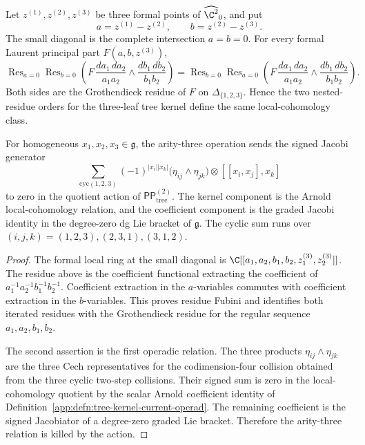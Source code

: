 \begin{lem}
\label{app:lem:arity-three-residue-jacobi}
  Let \(z^{(1)},z^{(2)},z^{(3)}\) be three formal points of
  \(\widehat{\C^2}_0\), and put
  \[
    a=z^{(1)}-z^{(2)},\qquad b=z^{(2)}-z^{(3)}.
  \]
  The small diagonal is the complete intersection \(a=b=0\).  For every
  formal Laurent principal part \(F(a,b,z^{(3)})\),
  \[
    \operatorname{Res}_{a=0}\operatorname{Res}_{b=0}
    \left(
      F\,
      \frac{da_1\,da_2}{a_1a_2}
      \wedge
      \frac{db_1\,db_2}{b_1b_2}
    \right)
    =
    \operatorname{Res}_{b=0}\operatorname{Res}_{a=0}
    \left(
      F\,
      \frac{da_1\,da_2}{a_1a_2}
      \wedge
      \frac{db_1\,db_2}{b_1b_2}
    \right).
  \]
  Both sides are the Grothendieck residue of \(F\) on
  \(\Delta_{\{1,2,3\}}\).  Hence the two nested-residue orders for the
  three-leaf tree kernel define the same local-cohomology class.

  For homogeneous \(x_1,x_2,x_3\in\mathfrak g\), the arity-three
  operation sends the signed Jacobi generator
  \[
    \sum_{\mathrm{cyc}(1,2,3)}
    (-1)^{|x_i||x_k|}
    \bigl(\eta_{ij}\wedge\eta_{jk}\bigr)
    \otimes [[x_i,x_j],x_k]
  \]
  to zero in the quotient action of
  \(\mathsf{PP}^{(2)}_{\mathrm{tree}}\).  The kernel component is the
  Arnold local-cohomology relation, and the coefficient component is the
  graded Jacobi identity in the degree-zero dg Lie bracket of
  \(\mathfrak g\).  The cyclic sum runs over
  \((i,j,k)=(1,2,3),(2,3,1),(3,1,2)\).
\end{lem}

\begin{proof}
  The formal local ring at the small diagonal is
  \(\C[[a_1,a_2,b_1,b_2,z^{(3)}_1,z^{(3)}_2]]\).  The residue above is
  the coefficient functional extracting the coefficient of
  \(a_1^{-1}a_2^{-1}b_1^{-1}b_2^{-1}\).  Coefficient extraction in the
  \(a\)-variables commutes with coefficient extraction in the
  \(b\)-variables.  This proves residue Fubini and identifies both
  iterated residues with the Grothendieck residue for the regular
  sequence \(a_1,a_2,b_1,b_2\).

  The second assertion is the first operadic relation.  The three
  products \(\eta_{ij}\wedge\eta_{jk}\) are the three Cech
  representatives for the codimension-four collision obtained from the
  three cyclic two-step collisions.  Their signed sum is zero in the
  local-cohomology quotient by the scalar Arnold coefficient identity of
  Definition~\ref{app:defn:tree-kernel-current-operad}.  The remaining
  coefficient is the signed Jacobiator of a degree-zero graded Lie
  bracket.  Therefore the arity-three relation is killed by the action.
\end{proof}

